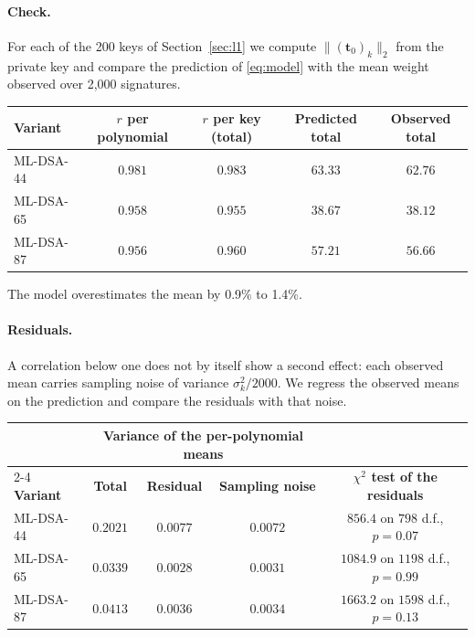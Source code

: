\documentclass{article}
\newcommand{\tzero}{\mathbf{t}_0}
\begin{document}
\paragraph{Check.}
For each of the 200 keys of Section~\ref{sec:l1} we compute
$\|(\tzero)_k\|_2$ from the private key and compare the prediction of
\eqref{eq:model} with the mean weight observed over 2,000 signatures.

\begin{center}
\begin{tabular}{lcccc}
\toprule
\textbf{Variant} & \textbf{$r$ per polynomial} & \textbf{$r$ per key (total)} &
\textbf{Predicted total} & \textbf{Observed total} \\
\midrule
ML-DSA-44 & $0.981$ & $0.983$ & $63.33$ & $62.76$ \\
ML-DSA-65 & $0.958$ & $0.955$ & $38.67$ & $38.12$ \\
ML-DSA-87 & $0.956$ & $0.960$ & $57.21$ & $56.66$ \\
\bottomrule
\end{tabular}
\end{center}

\noindent
The model overestimates the mean by 0.9\% to 1.4\%.

\paragraph{Residuals.}
A correlation below one does not by itself show a second effect: each observed
mean carries sampling noise of variance $\sigma_k^2/2000$.  We regress the
observed means on the prediction and compare the residuals with that noise.

\begin{center}
\begin{tabular}{lcccc}
\toprule
 & \multicolumn{3}{c}{\textbf{Variance of the per-polynomial means}} & \\
\cmidrule(lr){2-4}
\textbf{Variant} & \textbf{Total} & \textbf{Residual} & \textbf{Sampling noise} &
\textbf{$\chi^2$ test of the residuals} \\
\midrule
ML-DSA-44 & $0.2021$ & $0.0077$ & $0.0072$ & $856.4$ on $798$ d.f., $p = 0.07$ \\
ML-DSA-65 & $0.0339$ & $0.0028$ & $0.0031$ & $1084.9$ on $1198$ d.f., $p = 0.99$ \\
ML-DSA-87 & $0.0413$ & $0.0036$ & $0.0034$ & $1663.2$ on $1598$ d.f., $p = 0.13$ \\
\bottomrule
\end{tabular}
\end{center}
\end{document}
